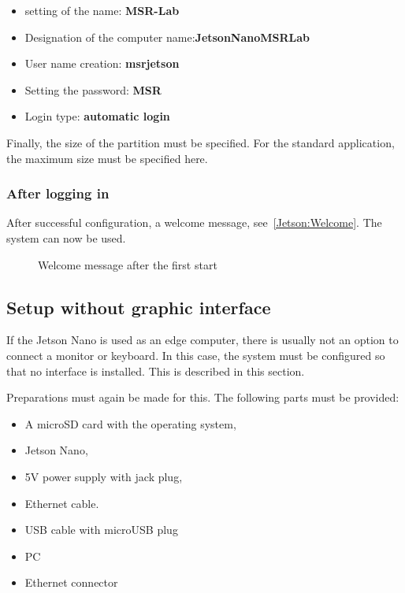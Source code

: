 \begin{itemize}
    \item setting of the name: \textbf{MSR-Lab}
    \item Designation of the computer name:\textbf{JetsonNanoMSRLab}
    \item User name creation: \textbf{msrjetson}
    \item Setting the password: \textbf{MSR}
    \item Login type: \textbf{automatic login}
\end{itemize}

Finally, the size of the partition must be specified. For the standard application, the maximum size must be specified here. 




\subsubsection{After logging in}

After successful configuration, a welcome message, see~\ref{Jetson:Welcome}. The system can now be used.


\begin{figure}
  \centering
  
 
  \caption{Welcome message after the first start}\label{Jetson:Willkommen}
\end{figure}

\subsection{Setup without graphic interface}

If the Jetson Nano is used as an edge computer, there is usually not an option to connect a monitor or keyboard. In this case, the system must be configured so that no interface is installed. This is described in this section.

Preparations must again be made for this. The following parts must be provided:

\begin{itemize}
    \item A microSD card with the operating system,
    \item Jetson Nano,
    \item 5V power supply with jack plug,
    \item Ethernet cable.
    \item USB cable with microUSB plug
    \item PC
    \item Ethernet connector
\end{itemize}

